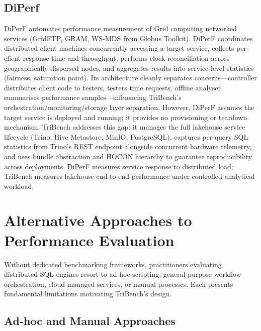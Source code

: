 \documentclass{l4proj}
\begin{document}
\subsection{DiPerf}
\label{sec:diperf}

DiPerF \citep{diperf} automates performance measurement of Grid computing networked services (GridFTP, GRAM, WS-MDS from Globus Toolkit). DiPerF coordinates distributed client machines concurrently accessing a target service, collects per-client response time and throughput, performs clock reconciliation across geographically dispersed nodes, and aggregates results into service-level statistics (fairness, saturation point). Its architecture cleanly separates concerns---controller distributes client code to testers, testers time requests, offline analyser summarises performance samples---influencing TriBench's orchestration/monitoring/storage layer separation. However, DiPerF assumes the target service is deployed and running; it provides no provisioning or teardown mechanism. TriBench addresses this gap: it manages the full lakehouse service lifecycle (Trino, Hive Metastore, MinIO, PostgreSQL), captures per-query SQL statistics from Trino's REST endpoint alongside concurrent hardware telemetry, and uses bundle abstraction and HOCON hierarchy to guarantee reproducibility across deployments. DiPerF measures service response to distributed load; TriBench measures lakehouse end-to-end performance under controlled analytical workload.

\section{Alternative Approaches to Performance Evaluation}
\label{sec:alternative_approaches}

Without dedicated benchmarking frameworks, practitioners evaluating distributed SQL engines resort to ad-hoc scripting, general-purpose workflow orchestration, cloud-managed services, or manual processes. Each presents fundamental limitations motivating TriBench's design.

\subsection{Ad-hoc and Manual Approaches}
\label{sec:adhoc}
\end{document}
